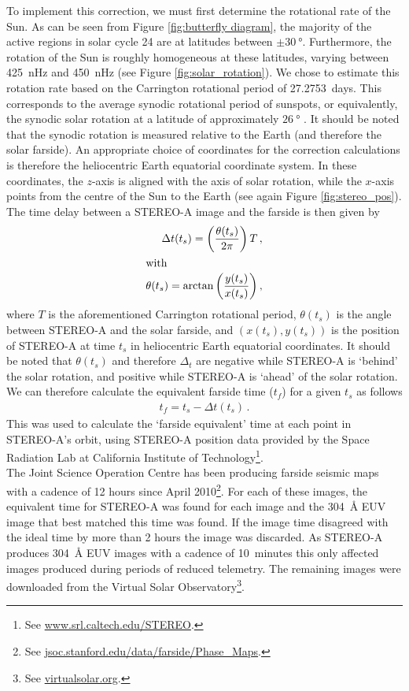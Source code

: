 \documentclass[11pt,a4paper,onecolumn]{report}
\begin{document}
To implement this correction, we must first determine the rotational
rate of the Sun. As can be seen from Figure \ref{fig:butterfly diagram}, the
majority of the active regions in solar cycle 24 are at latitudes between $\pm
\SI{30}{\degree}$. Furthermore, the rotation of the Sun is roughly homogeneous at
these latitudes, varying between \SI{425}{nHz} and \SI{450}{nHz} (see Figure
\ref{fig:solar_rotation}). We chose to estimate this rotation rate based on the
Carrington rotational period of \SI{27.2753}{days}. This corresponds to the
average synodic rotational period of sunspots, or equivalently, the synodic
solar rotation at a latitude of approximately \(\SI[]{26}[]{\degree}\)
\citep{carrington_observations_1863}. It should be noted that the synodic
rotation is measured relative to the Earth (and therefore the solar farside). An
appropriate choice of coordinates for the correction calculations is therefore
the heliocentric Earth equatorial coordinate system. In these coordinates, the
$z$-axis is aligned with the axis of solar rotation, while the $x$-axis points
from the centre of the Sun to the Earth (see again Figure \ref{fig:stereo_pos}).
The time delay between a STEREO-A image and the farside is then given by
\begin{align}
  \Delta t(t_s) = \left(\frac{\theta(t_s)}{2\pi}\right)T \, ,\\
  \intertext{with}
  \theta(t_s) = \arctan{\left(\frac{y(t_s)}{x(t_s)}\right)} \, ,
\end{align}
where $T$ is the aforementioned Carrington rotational period, $\theta(t_s)$ is
the angle between STEREO-A and the solar farside, and $(x(t_s), y(t_s))$ is the
position of STEREO-A at time $t_s$ in heliocentric Earth equatorial coordinates.
It should be noted that $\theta(t_s)$ and therefore $\Delta_t$ are negative
while STEREO-A is `behind' the solar rotation, and positive while STEREO-A is
`ahead' of the solar rotation. We can therefore calculate the equivalent farside
time ($t_f$) for a given $t_s$ as follows
\begin{align}
  t_f = t_s - \Delta t(t_s) \, .
\end{align}
This was used to calculate the `farside equivalent' time at each point in
STEREO-A's orbit, using STEREO-A position data provided by the Space Radiation
Lab at California Institute of Technology\footnote{See
\url{www.srl.caltech.edu/STEREO}.}. \\

The Joint Science Operation Centre has been producing farside seismic maps with
a cadence of 12 hours since April 2010\footnote{See
\url{jsoc.stanford.edu/data/farside/Phase_Maps}.}. For each of these images, the
equivalent time for STEREO-A was found for each image and the
\SI{304}{\angstrom} EUV image that best matched this time was found. If the
image time disagreed with the ideal time by more than 2 hours the image was
discarded. As STEREO-A produces \SI{304}{\angstrom} EUV images with a cadence of
\SI{10}{minutes} this only affected images produced during periods of reduced
telemetry. The remaining images were downloaded from the Virtual Solar
Observatory\footnote{See \url{virtualsolar.org}.}. \\
\end{document}

